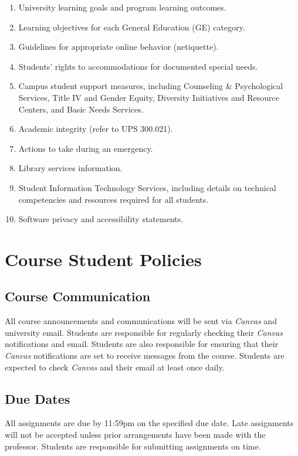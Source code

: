 \documentclass[12pt, letterpaper]{article}
\begin{document}
\begin{enumerate}
    \item   University learning goals and program learning outcomes.
    \item	Learning objectives for each General Education (GE) category.
    \item	Guidelines for appropriate online behavior (netiquette).
    \item	Students’ rights to accommodations for documented special needs.
    \item   Campus student support measures, including Counseling \& Psychological Services, Title IV and Gender Equity, Diversity Initiatives and Resource Centers, and Basic Needs Services.
    \item	Academic integrity (refer to UPS 300.021).
    \item	Actions to take during an emergency.
    \item	Library services information.
    \item	Student Information Technology Services, including details on technical competencies and resources required for all students.
    \item	Software privacy and accessibility statements.
\end{enumerate}

\section*{Course Student Policies}

\subsection*{Course Communication}
All course announcements and communications will be sent via \emph{Canvas} and university email. Students are responsible for regularly checking their \emph{Canvas} notifications and email. Students are also responsible for ensuring that their \emph{Canvas} notifications are set to receive messages from the course. Students are expected to check \emph{Canvas} and their email at least once daily.

\subsection*{Due Dates}
All assignments are due by 11:59pm on the specified due date. Late assignments will not be accepted unless prior arrangements have been made with the professor. Students are responsible for submitting assignments on time.
\end{document}
